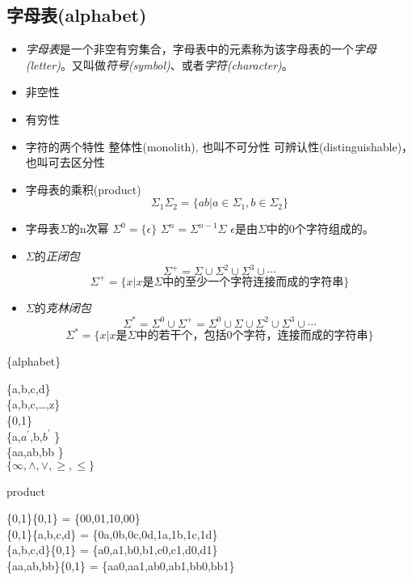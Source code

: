 \subsection{字母表(alphabet)}
\begin{itemize}
	\item \emph{字母表}是一个非空有穷集合，字母表中的元素称为该字母表的一个\emph{字母(letter)}。又叫做\emph{符号(symbol)}、或者\emph{字符(character)}。
	\item 非空性
	\item 有穷性
	\item 字符的两个特性
		\subitem{-} 整体性(monolith), 也叫不可分性
		\subitem{-} 可辨认性(distinguishable)，也叫可去区分性
	\item 字母表的乘积(product)
	\[\Sigma_1\Sigma_2 = \{ab|a\in \Sigma_1,b\in \Sigma_2 \} \]
	\item 字母表$\Sigma$的n次幂
		\subitem $\Sigma^0 = \{\epsilon\}$
		\subitem $\Sigma^n = \Sigma^{n-1}\Sigma$
		\subitem $\epsilon$是由$\Sigma$中的0个字符组成的。
	\item $\Sigma$的\emph{正闭包}
		\[\Sigma^{+} = \Sigma \cup \Sigma^2 \cup \Sigma^3 \cup \cdots \]
		\[\Sigma^+ = \{x|x\text{是}\Sigma\text{中的至少一个字符连接而成的字符串}\} \]
	\item $\Sigma$的\emph{克林闭包}
		\[\Sigma^{\ast} = \Sigma^0 \cup \Sigma^+ = \Sigma^0 \cup \Sigma \cup \Sigma^2 \cup \Sigma^3 \cup \cdots \]
		\[\Sigma^{\ast} = \{x|x\text{是}\Sigma\text{中的若干个，包括0个字符，连接而成的字符串}\} \]
\end{itemize}

\begin{example} \{alphabet\}
	\begin{flushleft}
		\{a,b,c,d\}\\
		\{a,b,c,\dots,z\}\\
		\{0,1\} \\
		\{a,$a^{\prime}$,b,$b^{\prime}$ \}\\
		\{aa,ab,bb \}\\
		$\{\infty,\land,\lor,\geq,\leq \}$
	\end{flushleft}
\end{example}

\begin{example} product
	\begin{flushleft}
		\{0,1\}\{0,1\} = \{00,01,10,00\}\\
		\{0,1\}\{a,b,c,d\} = \{0a,0b,0c,0d,1a,1b,1c,1d\}\\
		\{a,b,c,d\}\{0,1\} = \{a0,a1,b0,b1,c0,c1,d0,d1\}\\
		\{aa,ab,bb\}\{0,1\} = \{aa0,aa1,ab0,ab1,bb0,bb1\}
	\end{flushleft}
\end{example}

